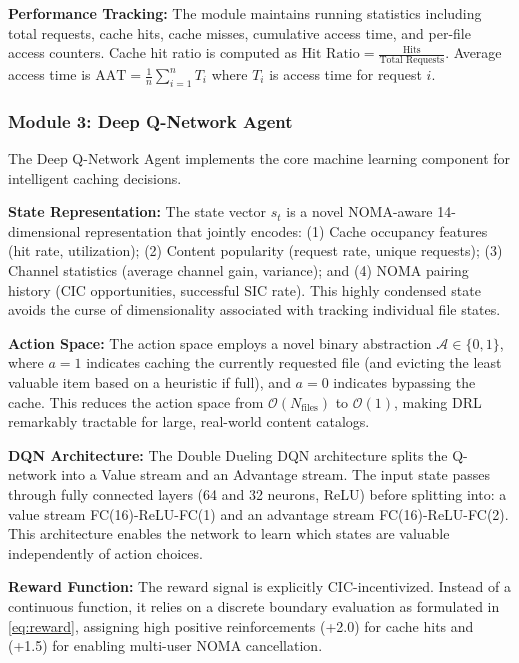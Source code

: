 \documentclass[12pt,a4paper]{article}
\begin{document}
\textbf{Performance Tracking:} The module maintains running statistics including total requests, cache hits, cache misses, cumulative access time, and per-file access counters. Cache hit ratio is computed as $\text{Hit Ratio} = \frac{\text{Hits}}{\text{Total Requests}}$. Average access time is $\text{AAT} = \frac{1}{n}\sum_{i=1}^n T_i$ where $T_i$ is access time for request $i$.

\subsubsection{Module 3: Deep Q-Network Agent}

The Deep Q-Network Agent implements the core machine learning component for intelligent caching decisions.

\textbf{State Representation:} The state vector $s_t$ is a novel NOMA-aware 14-dimensional representation that jointly encodes: (1) Cache occupancy features (hit rate, utilization); (2) Content popularity (request rate, unique requests); (3) Channel statistics (average channel gain, variance); and (4) NOMA pairing history (CIC opportunities, successful SIC rate). This highly condensed state avoids the curse of dimensionality associated with tracking individual file states.

\textbf{Action Space:} The action space employs a novel binary abstraction $\mathcal{A} \in \{0, 1\}$, where $a=1$ indicates caching the currently requested file (and evicting the least valuable item based on a heuristic if full), and $a=0$ indicates bypassing the cache. This reduces the action space from $\mathcal{O}(N_{\text{files}})$ to $\mathcal{O}(1)$, making DRL remarkably tractable for large, real-world content catalogs.

\textbf{DQN Architecture:} The Double Dueling DQN architecture splits the Q-network into a Value stream and an Advantage stream. The input state passes through fully connected layers (64 and 32 neurons, ReLU) before splitting into: a value stream FC(16)-ReLU-FC(1) and an advantage stream FC(16)-ReLU-FC(2). This architecture enables the network to learn which states are valuable independently of action choices.

\textbf{Reward Function:} The reward signal is explicitly CIC-incentivized. Instead of a continuous function, it relies on a discrete boundary evaluation as formulated in \eqref{eq:reward}, assigning high positive reinforcements (+2.0) for cache hits and (+1.5) for enabling multi-user NOMA cancellation.
\end{document}
